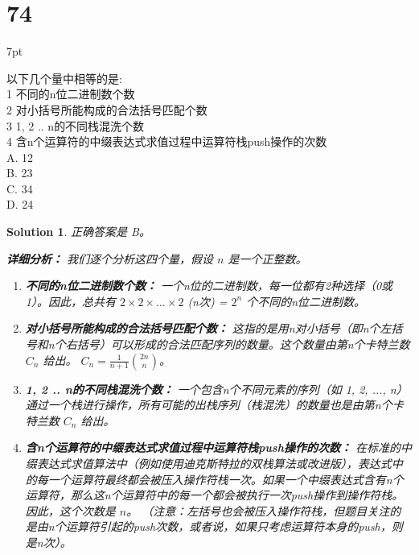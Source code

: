 \documentclass[UTF8]{report}
\newtheorem{solution}{Solution}
\theoremstyle{MyLineTheoremStyle} %
\theoremstyle{MyBlockTheoremStyle} %
\theoremstyle{MySubsubsectionStyle} %
\newenvironment{graybox}{%
        \def\FrameCommand{%
        \hspace{1pt}%
        {\color{gray}\small \vrule width 2pt}%
        {\color{graybox_color}\vrule width 4pt}%
        \colorbox{graybox_color}%
        }%
        \MakeFramed{\advance\hsize-\width\FrameRestore}%
        \noindent\hspace{-4.55pt}%
        \begin{adjustwidth}{}{7pt}%
        \vspace{2pt}\vspace{2pt}%
        }
        {%
        \vspace{2pt}\end{adjustwidth}\endMakeFramed%
        }
\begin{document}
\section*{74}
\begin{graybox}
以下几个量中相等的是:\\
1 不同的n位二进制数个数 \\
2 对小括号所能构成的合法括号匹配个数 \\
3 {1, 2 .. n}的不同栈混洗个数 \\
4 含n个运算符的中缀表达式求值过程中运算符栈push操作的次数 \\
A. 12 \\
B. 23 \\
C. 34 \\
D. 24
\end{graybox}

\begin{solution}
正确答案是 B。

\textbf{详细分析：}
我们逐个分析这四个量，假设 $n$ 是一个正整数。

\begin{enumerate}
    \item[\textbf{1}] \textbf{不同的n位二进制数个数：}
        一个n位的二进制数，每一位都有2种选择（0或1）。因此，总共有 $2 \times 2 \times \ldots \times 2$ (n次) = $2^n$ 个不同的n位二进制数。

    \item[\textbf{2}] \textbf{对小括号所能构成的合法括号匹配个数：}
        这指的是用n对小括号（即n个左括号和n个右括号）可以形成的合法匹配序列的数量。这个数量由第n个卡特兰数 $C_n$ 给出。
        $C_n = \frac{1}{n+1}\binom{2n}{n}$。

    \item[\textbf{3}] \textbf{{1, 2 .. n}的不同栈混洗个数：}
        一个包含n个不同元素的序列（如 {1, 2, ..., n}）通过一个栈进行操作，所有可能的出栈序列（栈混洗）的数量也是由第n个卡特兰数 $C_n$ 给出。

    \item[\textbf{4}] \textbf{含n个运算符的中缀表达式求值过程中运算符栈push操作的次数：}
        在标准的中缀表达式求值算法中（例如使用迪克斯特拉的双栈算法或改进版），表达式中的每一个运算符最终都会被压入操作符栈一次。如果一个中缀表达式含有n个运算符，那么这n个运算符中的每一个都会被执行一次push操作到操作符栈。因此，这个次数是 $n$。
        （注意：左括号也会被压入操作符栈，但题目关注的是由n个运算符引起的push次数，或者说，如果只考虑运算符本身的push，则是n次）。
\end{enumerate}


\end{solution}
\end{document}
